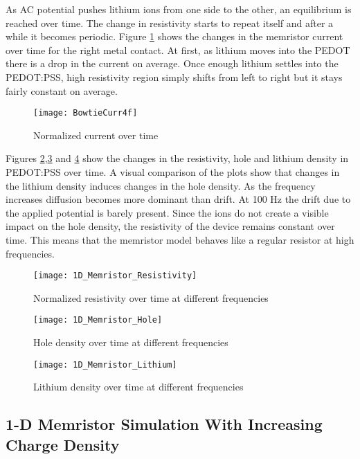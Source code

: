 \begin{doublespace}
As AC potential pushes lithium ions from one side to the other, an equilibrium is reached over time. The change in resistivity starts to repeat itself and after a while it becomes  periodic. Figure \ref{BowtieCurr} shows the changes in the memristor current over time for the right metal contact. At first, as lithium moves into the PEDOT there is a drop in the current on average. Once enough lithium settles into the PEDOT:PSS, high resistivity region simply shifts from left to right but it stays fairly constant on average. 

\begin{figure}[!htp]
\centering
\texttt{[image: BowtieCurr4f]}
\caption{Normalized current over time} 
\label{BowtieCurr}
\end{figure}

Figures \ref{BowtieRes},\ref{Bowhole} and \ref{Bowli} show the changes in the resistivity, hole and lithium density in PEDOT:PSS over time. A visual comparison of the plots show that changes in the lithium density induces changes in the hole density. As the frequency increases diffusion becomes more dominant than drift. At 100 Hz the drift due to the applied potential is barely present. Since the ions do not create a visible impact on the hole density, the resistivity of the device remains constant over time. This means that the memristor model behaves like a regular resistor at high frequencies.

\begin{figure}[!htp]
\centering
\texttt{[image: 1D\_Memristor\_Resistivity]}
\caption{Normalized resistivity over time at different frequencies} 
\label{BowtieRes}
\end{figure}

\begin{figure}[!htp]
\centering
\texttt{[image: 1D\_Memristor\_Hole]}
\caption{Hole density over time at different frequencies} 
\label{Bowhole}
\end{figure}



\begin{figure}[!htp]
\centering
\texttt{[image: 1D\_Memristor\_Lithium]}
\caption{Lithium density over time at different frequencies} 
\label{Bowli}
\end{figure}


\clearpage
\subsection{1-D Memristor Simulation With Increasing Charge Density}


\end{doublespace}
